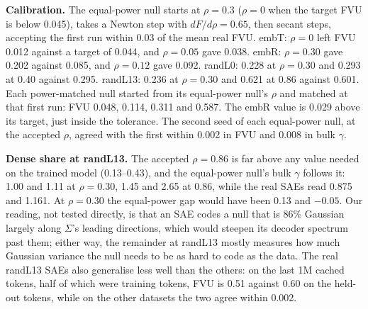 \documentclass[10pt,twocolumn]{article}
\newcommand{\Sig}{\Sigma}
\begin{document}
\begin{table}[!htb]
\centering
\caption{Ladder datasets and their trained counterparts. $\Sig$: top-1 and top-10 eigenvalue shares and participation ratio (PR), and $\Sig$'s slope with the $R^2$ of its log-log fit in the two bulk windows. Cloud fit: smallest $R^2$ over the real, equal-power and power-matched decoder clouds (fixed-$n$ mean spectrum) in ranks 31--450 / 101--1000. Live latents: smallest count among the real, equal-power and power-matched SAEs. Top-1\% power: share of latent power on the top 1\% of latents for the real seed-0 SAE, of atom power for the power-matched dictionary, and of latent power for the SAE trained on it.}
\label{tab:ladder_detail}
\footnotesize
\setlength{\tabcolsep}{2.5pt}

\end{table}

\textbf{Calibration.} The equal-power null starts at $\rho=0.3$ ($\rho=0$ when the target FVU is below 0.045), takes a Newton step with $dF/d\rho=0.65$, then secant steps, accepting the first run within 0.03 of the mean real FVU. embT: $\rho=0$ left FVU 0.012 against a target of 0.044, and $\rho=0.05$ gave 0.038. embR: $\rho=0.30$ gave 0.202 against 0.085, and $\rho=0.12$ gave 0.092. randL0: 0.228 at $\rho=0.30$ and 0.293 at 0.40 against 0.295. randL13: 0.236 at $\rho=0.30$ and 0.621 at 0.86 against 0.601. Each power-matched null started from its equal-power null's $\rho$ and matched at that first run: FVU 0.048, 0.114, 0.311 and 0.587. The embR value is 0.029 above its target, just inside the tolerance. The second seed of each equal-power null, at the accepted $\rho$, agreed with the first within 0.002 in FVU and 0.008 in bulk $\gamma$.

\textbf{Dense share at randL13.} The accepted $\rho=0.86$ is far above any value needed on the trained model (0.13--0.43), and the equal-power null's bulk $\gamma$ follows it: 1.00 and 1.11 at $\rho=0.30$, 1.45 and 2.65 at 0.86, while the real SAEs read 0.875 and 1.161. At $\rho=0.30$ the equal-power gap would have been 0.13 and $-0.05$. Our reading, not tested directly, is that an SAE codes a null that is 86\% Gaussian largely along $\Sig$'s leading directions, which would steepen its decoder spectrum past them; either way, the remainder at randL13 mostly measures how much Gaussian variance the null needs to be as hard to code as the data. The real randL13 SAEs also generalise less well than the others: on the last 1M cached tokens, half of which were training tokens, FVU is 0.51 against 0.60 on the held-out tokens, while on the other datasets the two agree within 0.002.
\end{document}

